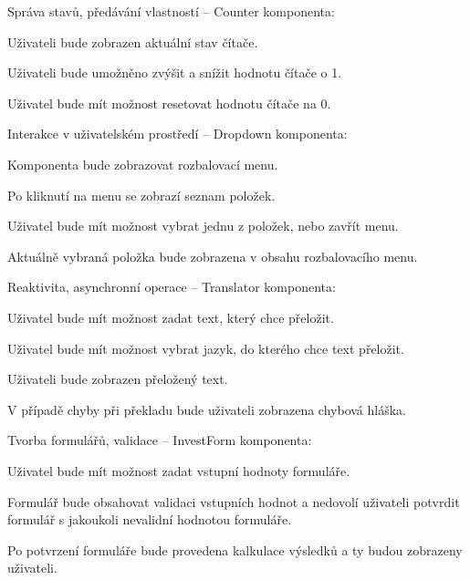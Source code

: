 \begin{citemize}
	\item Správa stavů, předávání vlastností -- Counter komponenta:
	
	\begin{cenumerate}
		\item Uživateli bude zobrazen aktuální stav čítače.
		\item Uživateli bude umožněno zvýšit a snížit hodnotu čítače o 1.
		\item Uživatel bude mít možnost resetovat hodnotu čítače na 0.
	\end{cenumerate}

	\item Interakce v uživatelském prostředí -- Dropdown komponenta:
	
	\begin{cenumerate}
		\item Komponenta bude zobrazovat rozbalovací menu.
		\item Po kliknutí na menu se zobrazí seznam položek.
		\item Uživatel bude mít možnost vybrat jednu z položek, nebo zavřít menu.
		\item Aktuálně vybraná položka bude zobrazena v obsahu rozbalovacího menu.
	\end{cenumerate}

	\item Reaktivita, asynchronní operace -- Translator komponenta:
	
	\begin{cenumerate}
		\item Uživatel bude mít možnost zadat text, který chce přeložit.
		\item Uživatel bude mít možnost vybrat jazyk, do kterého chce text přeložit.
		\item Uživateli bude zobrazen přeložený text.
		\item V případě chyby při překladu bude uživateli zobrazena chybová hláška.
	\end{cenumerate}

	\item Tvorba formulářů, validace -- InvestForm komponenta:
	
	\begin{cenumerate}
		\item Uživatel bude mít možnost zadat vstupní hodnoty formuláře.
		\item Formulář bude obsahovat validaci vstupních hodnot a nedovolí uživateli potvrdit formulář s jakoukoli nevalidní hodnotou formuláře.
		\item Po potvrzení formuláře bude provedena kalkulace výsledků a ty budou zobrazeny uživateli.
	\end{cenumerate}


\end{citemize}
